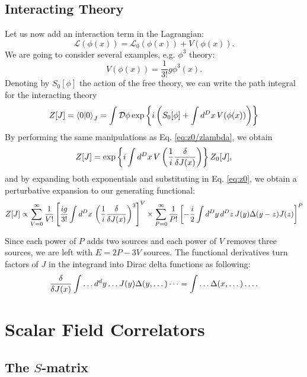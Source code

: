 \documentclass{article}
\numberwithin{equation}{section}
\begin{document}
\subsection{Interacting Theory}
Let us now add an interaction term in the Lagrangian:
\begin{equation}
    \mathcal{L}(\phi(x)) = \mathcal{L}_0(\phi(x)) + V(\phi(x)).
\end{equation}
We are going to consider several examples, e.g. $\phi^3$ theory:
\begin{equation}
    V(\phi(x)) = \frac{1}{3!}g \phi^3(x).
\end{equation}
Denoting by $S_0[\phi]$ the action of the free theory, we can write the path integral for the interacting theory
\begin{equation}
    Z[J] = \braket{0}{0}_J = \int \mathcal{D}\phi \exp\left\{i\left(S_0[\phi] + \int d^Dx \, V(\phi(x))\right)\right\}
\end{equation}
By performing the same manipulations as Eq. \ref{eq:z0/zlambda}, we obtain
\begin{equation}
    Z[J] = \exp\left\{i \int d^Dx \, V\left(\frac{1}{i}\fdv{J(x)}\right)\right\} Z_0[J],
\end{equation}
and by expanding both exponentials and substituting in Eq. \ref{eq:z0}, we obtain a perturbative expansion to our generating functional:
\begin{equation}
    Z[J] \propto \sum_{V=0}^\infty \frac{1}{V!} \left[\frac{ig}{3!} \int d^Dx \, \left(\frac{1}{i}\fdv{J(x)}\right)^3\right]^V \times \sum_{P=0}^\infty \frac{1}{P!} \left[-\frac{i}{2} \int d^Dy \, d^Dz \, J(y) \Delta(y-z)J(z)\right]^P
\end{equation}

Since each power of $P$ adds two sources and each power of $V$ removes three sources, we are left with $E=2P-3V$ sources. The functional derivatives turn factors of $J$ in the integrand into Dirac delta functions as following:
\begin{equation}
    \fdv{J(x)}\int \dots d^dy \dots J(y)\Delta(y, \dots) \dots = \int \dots \Delta(x, \dots) \dots .
\end{equation}

\section{Scalar Field Correlators}

\subsection{The $S$-matrix}
\end{document}
